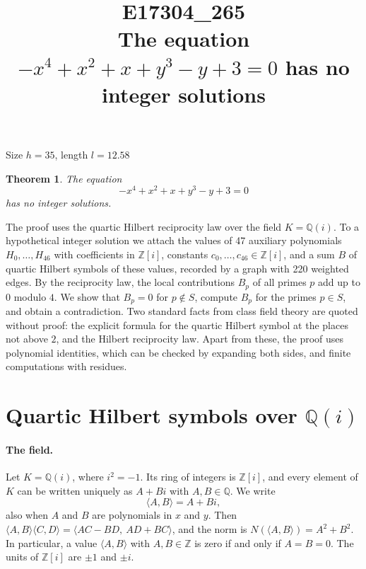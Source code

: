 \documentclass[11pt]{article}
\title{\textbf{E17304\_265}\\[4pt] {\Large The equation $-x^{4}+x^{2}+x+y^{3}-y+3=0$ has no integer solutions}}
\author{}
\date{}
\newtheorem{theorem}{Theorem}
\newcommand{\Z}{\mathbb{Z}}
\newcommand{\Q}{\mathbb{Q}}
\begin{document}
\maketitle
\vspace{-8ex}
\begin{center}
Size $h=35$, length $l=12.58$
\end{center}

\begin{theorem}\label{thm:main}
The equation
\begin{equation}\label{eq:main}
-x^{4}+x^{2}+x+y^{3}-y+3=0
\end{equation}
has no integer solutions.
\end{theorem}

The proof uses the quartic Hilbert reciprocity law over the field $K=\Q(i)$. To a hypothetical integer solution we attach the values of 47 auxiliary polynomials $H_0,\dots,H_{46}$ with coefficients in $\Z[i]$, constants $c_0,\dots,c_{46}\in\Z[i]$, and a sum $B$ of quartic Hilbert symbols of these values, recorded by a graph with 220 weighted edges. By the reciprocity law, the local contributions $B_p$ of all primes $p$ add up to $0$ modulo $4$. We show that $B_p=0$ for $p\notin S$, compute $B_p$ for the primes $p\in S$, and obtain a contradiction. Two standard facts from class field theory are quoted without proof: the explicit formula for the quartic Hilbert symbol at the places not above $2$, and the Hilbert reciprocity law. Apart from these, the proof uses polynomial identities, which can be checked by expanding both sides, and finite computations with residues.


\section{\texorpdfstring{Quartic Hilbert symbols over $\Q(i)$}{Quartic Hilbert symbols over Q(i)}}\label{sec:symbols}

\paragraph{The field.} Let $K=\Q(i)$, where $i^2=-1$. Its ring of integers is $\Z[i]$, and every element of $K$ can be written uniquely as $A+Bi$ with $A,B\in\Q$. We write
\[
\langle A,B\rangle=A+Bi,
\]
also when $A$ and $B$ are polynomials in $x$ and $y$. Then $\langle A,B\rangle\langle C,D\rangle=\langle AC-BD,\ AD+BC\rangle$, and the norm is $N(\langle A,B\rangle)=A^2+B^2$. In particular, a value $\langle A,B\rangle$ with $A,B\in\Z$ is zero if and only if $A=B=0$. The units of $\Z[i]$ are $\pm1$ and $\pm i$.
\end{document}
